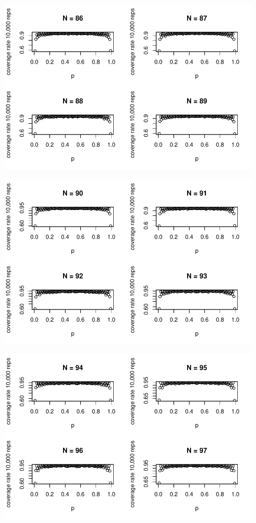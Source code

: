 \documentclass{article}\usepackage[]{graphicx}\usepackage[]{color}
\makeatletter
\def\maxwidth{ %
  \ifdim\Gin@nat@width>\linewidth
    \linewidth
  \else
    \Gin@nat@width
  \fi
}
\newenvironment{knitrout}{}{} %
\makeatother
\begin{document}
\begin{enumerate}
\begin{knitrout}
{}




{\centering \includegraphics[width=\maxwidth]{figure/prob1_final-11} 

}




{\centering \includegraphics[width=\maxwidth]{figure/prob1_final-12} 

}




{\centering \includegraphics[width=\maxwidth]{figure/prob1_final-13} 

}
\end{knitrout}
\end{enumerate}
\end{document}
